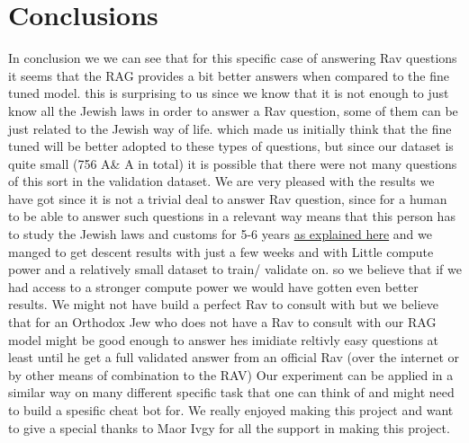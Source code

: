\documentclass[11pt]{article}
\begin{document}
\section{Conclusions}
In conclusion we we can see that for this specific case of answering Rav questions it seems that the RAG provides a bit better answers when compared to the fine tuned model. this is surprising to us since we know that it is not enough to just know all the Jewish laws in order to answer a Rav question, some of them can be just related to the Jewish way of life. which made us initially think that the fine tuned will be better adopted to these types of questions, but since our dataset is quite small (756 A\& A in total) it is possible that there were not many questions of this sort in the validation dataset.
We are very pleased with the results we have got since it is not a trivial deal to answer Rav question, since for a human to be able to answer such questions in a relevant way means that this person has to study the Jewish laws and customs for 5-6 years  \href{https://hds.harvard.edu/academics/ministry-studies/denominational-instruction/ordination-requirements/jewish-ordination#:~:text=This%20is%20a%20process%20that,fields%20of%20study%20or%20work. }{as explained here}  and we manged to get descent results with just a few weeks and with Little compute power and a relatively small dataset to train/ validate on. so we believe that if we had access to a stronger compute power we would have gotten even better results.
We might not have build a perfect Rav to consult with but we believe that for an Orthodox Jew who does not have a Rav to consult with our RAG model might be good enough to answer hes imidiate reltivly easy questions at least until he get a full validated answer from an official Rav (over the internet or by other means of combination to the RAV)
Our experiment can be applied in a similar way on many different specific task that one can think of and might need to build a spesific cheat bot for.
We really enjoyed making this project and want to give a special thanks to Maor Ivgy for all the support in making this project.
\end{document}
